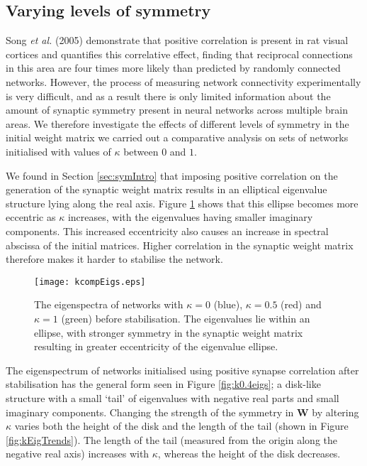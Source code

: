 \documentclass[12pt, a4paper]{article}
\begin{document}
\FloatBarrier
\subsection{Varying levels of symmetry}
Song \emph{et al.} (2005) demonstrate that positive correlation is present in rat visual cortices and quantifies this correlative effect, finding that reciprocal connections in this area are four times more likely than predicted by randomly connected networks.  However, the process of measuring network connectivity experimentally is very difficult, and as a result there is only limited information about the amount of synaptic symmetry present in neural networks across multiple brain areas.  We therefore investigate the effects of different levels of symmetry in the initial weight matrix we carried out a comparative analysis on sets of networks initialised with values of $\kappa$ between $0$ and $1$.

We found in Section \ref{sec:symIntro} that imposing positive correlation on the generation of the synaptic weight matrix results in an elliptical eigenvalue structure lying along the real axis.  Figure \ref{fig:kappaEigs} shows that this ellipse becomes more eccentric as $\kappa$ increases, with the eigenvalues having smaller imaginary components.  This increased eccentricity also causes an increase in spectral abscissa of the initial matrices.  Higher correlation in the synaptic weight matrix therefore makes it harder to stabilise the network.

\begin{figure}
    \centering
    \texttt{[image: kcompEigs.eps]}
    \caption{The eigenspectra of networks with $\kappa = 0$ (blue), $\kappa = 0.5$ (red) and $\kappa = 1$ (green) before stabilisation.  The eigenvalues lie within an ellipse, with stronger symmetry in the synaptic weight matrix resulting in greater eccentricity of the eigenvalue ellipse.}
    \label{fig:kappaEigs}
\end{figure}


The eigenspectrum of networks initialised using positive synapse correlation after stabilisation has the general form seen in Figure \ref{fig:k0.4eigs}; a disk-like structure with a small `tail' of eigenvalues with negative real parts and small imaginary components.  Changing the strength of the symmetry in $\mathbf{W}$ by altering $\kappa$ varies both the height of the disk and the length of the tail (shown in Figure \ref{fig:kEigTrends}).  The length of the tail (measured from the origin along the negative real axis) increases with $\kappa$, whereas the height of the disk decreases.  
\end{document}
